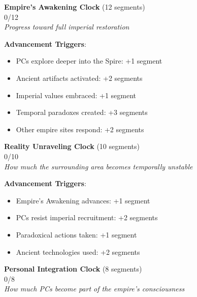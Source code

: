 \documentclass[11pt]{article}
\newcommand{\clocksegment}{\textbullet}
\begin{document}
\begin{center}
\textbf{Empire's Awakening Clock} (12 segments)\\
\fbox{\clocksegment\clocksegment\clocksegment\clocksegment\clocksegment\clocksegment\clocksegment\clocksegment\clocksegment\clocksegment\clocksegment\clocksegment} 0/12\\
\textit{Progress toward full imperial restoration}
\end{center}

\textbf{Advancement Triggers}:
\begin{itemize}[leftmargin=*]
\item PCs explore deeper into the Spire: +1 segment
\item Ancient artifacts activated: +2 segments
\item Imperial values embraced: +1 segment
\item Temporal paradoxes created: +3 segments
\item Other empire sites respond: +2 segments
\end{itemize}

\begin{center}
\textbf{Reality Unraveling Clock} (10 segments)\\
\fbox{\clocksegment\clocksegment\clocksegment\clocksegment\clocksegment\clocksegment\clocksegment\clocksegment\clocksegment\clocksegment} 0/10\\
\textit{How much the surrounding area becomes temporally unstable}
\end{center}

\textbf{Advancement Triggers}:
\begin{itemize}[leftmargin=*]
\item Empire's Awakening advances: +1 segment
\item PCs resist imperial recruitment: +2 segments
\item Paradoxical actions taken: +1 segment
\item Ancient technologies used: +2 segments
\end{itemize}

\begin{center}
\textbf{Personal Integration Clock} (8 segments)\\
\fbox{\clocksegment\clocksegment\clocksegment\clocksegment\clocksegment\clocksegment\clocksegment\clocksegment} 0/8\\
\textit{How much PCs become part of the empire's consciousness}
\end{center}
\end{document}

